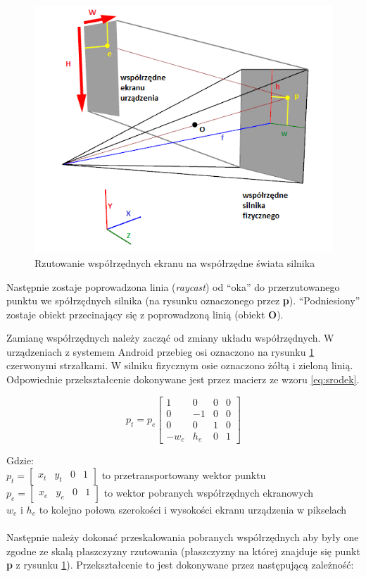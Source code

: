 \begin{figure}
\centering
\includegraphics[scale = 0.8]{./img/Rzutowanie.png}
\caption{Rzutowanie współrzędnych ekranu na współrzędne świata silnika}
\label{fig:raycast}
\end{figure}

Następnie zostaje poprowadzona linia (\emph{raycast}) od ``oka'' do
przerzutowanego punktu we spółrzędnych silnika (na rysunku
oznaczonego przez \textbf{p}). ``Podniesiony'' zostaje obiekt przecinający się z
poprowadzoną linią (obiekt \textbf{O}).

Zamianę współrzędnych należy zacząć od zmiany układu współrzędnych. W
urządzeniach z systemem Android przebieg osi oznaczono na rysunku
\ref{fig:raycast} czerwonymi strzałkami. W silniku fizycznym osie oznaczono
żółtą i zieloną linią. Odpowiednie przekształcenie dokonywane jest przez macierz
ze wzoru \ref{eq:srodek}.

\begin{equation}p_{t} = 
p_{e}
\begin{bmatrix}1&0&0&0\\0&-1&0&0\\0&0&1&0\\-w_{e}&h_{e}&0&1\end{bmatrix}
\label{eq:srodek}
\end{equation}

Gdzie:\\
$ p_{t} = \begin{bmatrix}x_{t}&y_{t}&0&1\end{bmatrix} $ to przetransportowany
wektor punktu\\
$ p_{e} = \begin{bmatrix}x_{e}&y_{e}&0&1\end{bmatrix} $ to wektor pobranych
współrzędnych ekranowych\\
$ w_{e} $ i $ h_{e} $ to kolejno połowa szerokości i wysokości ekranu urządzenia
w pikselach
\\ \\
Następnie należy dokonać przeskalowania pobranych współrzędnych aby były one
zgodne ze skalą płaszczyzny rzutowania (płaszczyzny na której znajduje się
punkt \textbf{p} z rysunku \ref{fig:raycast}). Przekształcenie to jest
dokonywane przez następującą zależność:

